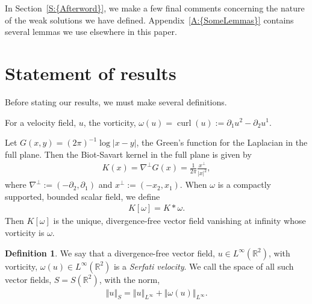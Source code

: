 \documentclass[reqno,openright,11pt,twoside]{amsart}
\theoremstyle{definition}
\newtheorem{definition}[theorem]{Definition}
\numberwithin{equation}{section}
\begin{document}
In {Section~\ref{S:{Afterword}}}, we make a few final comments concerning the nature of the weak solutions we have defined.
{Appendix~\ref{A:{SomeLemmas}}} contains several lemmas we use elsewhere in this paper.

\section{Statement of results}\label{S:Results}

\noindent
Before stating our results, we must make several definitions.

For a velocity field, $u$, the vorticity, $\omega(u) = \operatorname{curl}(u) := {\ensuremath{\partial}}_1 u^2 - {\ensuremath{\partial}}_2 u^1$.

Let $G(x, y) = (2 \pi)^{-1} \log {\left\vert{x - y}\right\vert}$, the Green's function for the Laplacian in the full plane. Then the Biot-Savart kernel in the full plane is given by
\begin{align}\label{e:K}
	K(x)
	    = {\ensuremath{\nabla}}^\perp G(x)
	    = \frac{1}{2 \pi} \frac{x^\perp}{{\left\vert{x}\right\vert}^2},
\end{align}
where ${\ensuremath{\nabla}}^\perp := (-{\ensuremath{\partial}}_2, {\ensuremath{\partial}}_1)$ and $x^\perp := (-x_2, x_1)$. When $\omega$ is a compactly supported, bounded scalar field, we define
\begin{align}\label{e:BSLawFullPlane}
    K[\omega]
        
        = K * \omega.
\end{align}
Then $K[\omega]$ is the unique, divergence-free vector field vanishing at infinity whose vorticity is $\omega$.

\begin{definition}\label{D:SerfatiVelocity}
	We say that a divergence-free vector field, $u \in L^{\ensuremath{\infty}}({\ensuremath{{\ensuremath{\mathbb{{R}}}}}}^2)$, with vorticity,
	$\omega(u) \in L^{\ensuremath{\infty}}({\ensuremath{{\ensuremath{\mathbb{{R}}}}}}^2)$
	is a \textit{Serfati velocity}.
	We call the space of all such vector fields, $S = S({\ensuremath{{\ensuremath{\mathbb{{R}}}}}}^2)$, with the norm,
	\begin{align*}
		{\ensuremath{\left\Vert {u} \right\Vert}}_S
			= {\ensuremath{\left\Vert {u} \right\Vert}}_{L^{\ensuremath{\infty}}} + {\ensuremath{\left\Vert {\omega(u)} \right\Vert}}_{L^{\ensuremath{\infty}}}.
	\end{align*}
\end{definition}
\end{document}
